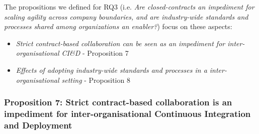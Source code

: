 The propositions we defined for  
RQ3 (i.e. {\em Are closed-contracts an impediment for scaling agility across company boundaries, and 
are industry-wide standards and processes shared among organizations an enabler?}) focus on these aspects:

\begin{itemize}
\item {\em Strict contract-based collaboration can be seen as an impediment for inter-organisational CI\&D}  - Proposition 7 
\item {\em Effects of adopting industry-wide standards and processes in a inter-organisational setting} - Proposition 8 
\end{itemize}

\vspace{.2cm}
\subsubsection{Proposition 7: Strict contract-based collaboration is an impediment for inter-organisational Continuous Integration and Deployment}

